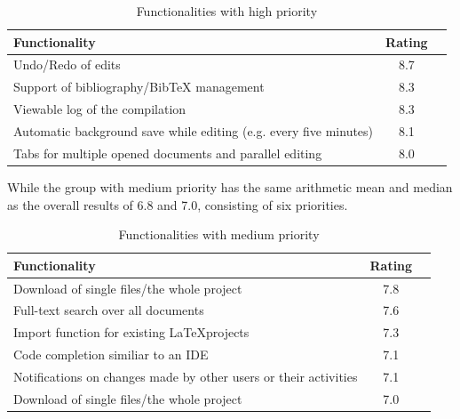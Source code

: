 \begin{table}[H]
	\begin{center}
		\footnotesize
		\setlength\extrarowheight{5pt}
		\begin{tabular}{ p{11cm} cp{1.5cm} }
		  	\textbf{Functionality} 	  														& \textbf{Rating} \\
			\hline
			Undo/Redo of edits																& 8.7 \\
			Support of bibliography/BibTeX management										& 8.3 \\
			Viewable log of the compilation													& 8.3 \\
			Automatic background save while editing (e.g. every five minutes)				& 8.1 \\
			Tabs for multiple opened documents and parallel editing							& 8.0 \\
		\end{tabular}
		\caption{Functionalities with high priority}
		\label{tab:high-priority}
	\end{center}
\end{table}

While the group with medium priority has the same arithmetic mean and median as the overall results of 6.8 and 7.0, consisting of six priorities.

\begin{table}[H]
	\begin{center}
		\footnotesize
		\setlength\extrarowheight{5pt}
		\begin{tabular}{ p{11cm} cp{1.5cm} }
		  	\textbf{Functionality} 	  														& \textbf{Rating} \\
			\hline
			Download of single files/the whole project										& 7.8 \\
			Full-text search over all documents												& 7.6 \\
			Import function for existing \LaTeX projects									& 7.3 \\
			Code completion similiar to an IDE												& 7.1 \\
			Notifications on changes made by other users or their activities				& 7.1 \\
			Download of single files/the whole project										& 7.0 \\
		\end{tabular}
		\caption{Functionalities with medium priority}
		\label{tab:medium-priority}
	\end{center}
\end{table}

